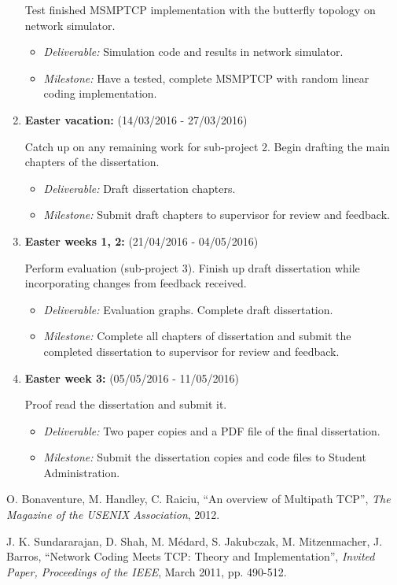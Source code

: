 \documentclass[12pt,a4paper,twoside]{article}
\begin{document}
\begin{enumerate}
Test finished MSMPTCP implementation with the butterfly topology on network simulator.
\begin{itemize}
  \item {\em Deliverable:} Simulation code and results in network simulator.
  \item {\em Milestone:} Have a tested, complete MSMPTCP with random linear coding implementation.
\end{itemize}

\item {\bf Easter vacation:} (14/03/2016 - 27/03/2016)

Catch up on any remaining work for sub-project 2.
Begin drafting the main chapters of the dissertation.
\begin{itemize}
  \item {\em Deliverable:} Draft dissertation chapters.
  \item {\em Milestone:} Submit draft chapters to supervisor for review and feedback.
\end{itemize}

\item {\bf Easter weeks 1, 2:} (21/04/2016 - 04/05/2016)

Perform evaluation (sub-project 3). Finish up draft dissertation while incorporating changes from feedback received.
\begin{itemize}
  \item {\em Deliverable:} Evaluation graphs. Complete draft dissertation.
  \item {\em Milestone:} Complete all chapters of dissertation and submit the completed dissertation to supervisor for review and feedback.
\end{itemize}

\item {\bf Easter week 3:} (05/05/2016 - 11/05/2016)

Proof read the dissertation and submit it. 
\begin{itemize}
  \item {\em Deliverable:} Two paper copies and a PDF file of the final dissertation.
  \item {\em Milestone:} Submit the dissertation copies and code files to Student Administration.
\end{itemize}

\end{enumerate}


\begin{thebibliography}{9}

  O. Bonaventure, M. Handley, C. Raiciu,
  ``An overview of Multipath TCP'',
  \emph{The Magazine of the USENIX Association},
  2012.

  J. K. Sundararajan, D. Shah, M. Médard, S. Jakubczak, M. Mitzenmacher, J. Barros,
  ``Network Coding Meets TCP: Theory and Implementation'',
  \emph{Invited Paper, Proceedings of the IEEE},
  March 2011,
  pp. 490-512.

\end{thebibliography}
\end{document}
